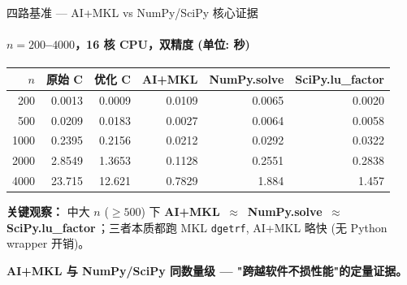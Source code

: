 \documentclass[12pt,aspectratio=169]{beamer}
\begin{document}
\begin{frame}[shrink]{四路基准 — AI+MKL vs NumPy/SciPy 核心证据}
\framesubtitle{$n=200$–$4000$，16 核 CPU，双精度 (单位: 秒)}

\footnotesize
\begin{center}
\renewcommand{\arraystretch}{1.1}
\setlength{\tabcolsep}{4pt}
\begin{tabular}{@{}r r r r r r@{}}
\toprule
$n$ & \textbf{原始 C} & \textbf{优化 C} & \textbf{AI+MKL} & \textbf{NumPy.solve} & \textbf{SciPy.lu\_factor} \\
\midrule
200  & 0.0013 & 0.0009 & 0.0109 & 0.0065 & 0.0020 \\
500  & 0.0209 & 0.0183 & 0.0027 & 0.0064 & 0.0058 \\
1000 & 0.2395 & 0.2156 & 0.0212 & 0.0292 & 0.0322 \\
2000 & 2.8549 & 1.3653 & 0.1128 & 0.2551 & 0.2838 \\
4000 & 23.715 & 12.621 & 0.7829 & 1.884  & 1.457  \\
\bottomrule
\end{tabular}
\end{center}
\normalsize

\vspace{4pt}
\small
\textbf{关键观察：} 中大 $n$ ($\ge 500$) 下 \textbf{AI+MKL $\,\approx\,$ NumPy.solve $\,\approx\,$ SciPy.lu\_factor}\,；三者本质都跑 MKL \texttt{dgetrf}, AI+MKL 略快 (无 Python wrapper 开销)。

\vspace{2pt}
\begin{center}
\textbf{AI+MKL 与 NumPy/SciPy 同数量级 — "跨越软件不损性能"的定量证据。}
\end{center}
\end{frame}
\end{document}
